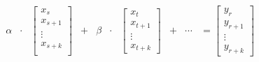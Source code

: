 $$
\begin{matrix}
 \alpha & \cdot & \begin{bmatrix}
                            x_s      \\
                            x_{s+1}  \\
                              \vdots \\
                            x_{s+k}  \\
  \end{bmatrix} & + & \beta & \cdot & \begin{bmatrix}
                                        x_t \\
                                        x_{t+1} \\
                                        \vdots \\
                                        x_{t+k}
                                                                      \end{bmatrix} & + & \cdots & =  \begin{bmatrix}
                                                                                                         y_{r} \\
                                                                                                         y_{r+1} \\
                                                                                                         \vdots \\
                                                                                                         y_{r+k}
                                                                                                        \end{bmatrix}
\end{matrix}
$$
